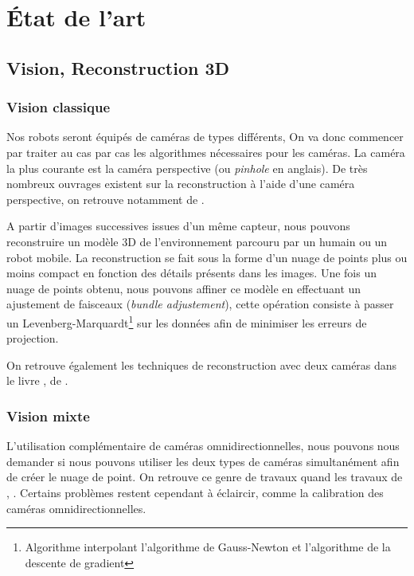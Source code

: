 \section{État de l'art}
\label{sec:etatart}

\subsection{Vision, Reconstruction 3D}

\subsubsection{Vision classique}

Nos robots seront équipés de caméras de types différents, On va donc commencer par traiter au cas par cas les algorithmes nécessaires pour les caméras.
La caméra la plus courante est la caméra perspective (ou \textit{pinhole} en anglais).
De très nombreux ouvrages existent sur la reconstruction à l'aide d'une caméra perspective, on retrouve notamment   de \citeauthor{Hartley03Book} \cite{Hartley03Book}.

A partir d'images successives issues d'un même capteur, nous pouvons reconstruire un modèle 3D de l'environnement parcouru par un humain ou un robot mobile.
La reconstruction se fait sous la forme d'un nuage de points plus ou moins compact en fonction des détails présents dans les images.
Une fois un nuage de points obtenu, nous pouvons affiner ce modèle en effectuant un ajustement de faisceaux (\textit{bundle adjustement}), cette opération consiste à passer un Levenberg-Marquardt\footnote{Algorithme interpolant l'algorithme de Gauss-Newton et l'algorithme de la descente de gradient} sur les données afin de minimiser les erreurs de projection.

On retrouve également les techniques de reconstruction avec deux caméras dans le livre \cite{HoraudBook},  de \citeauthor{HoraudBook}.



\subsubsection{Vision mixte}

L'utilisation complémentaire de caméras omnidirectionnelles, nous pouvons nous demander si nous pouvons utiliser les deux types de caméras simultanément afin de créer le nuage de point.
On retrouve ce genre de travaux quand les travaux de
\citeauthor{Sturm02},  \cite{Sturm02}.
Certains problèmes restent cependant à éclaircir, comme la calibration des caméras omnidirectionnelles.

